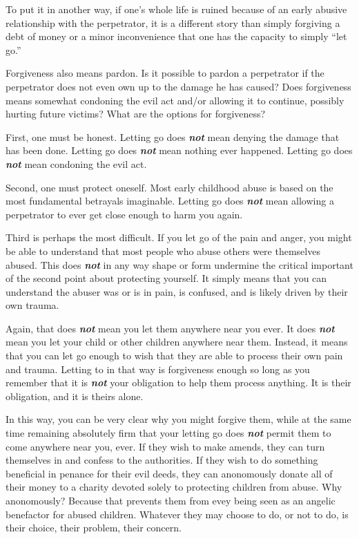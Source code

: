 \documentclass[]{book}
\begin{document}
To put it in another way, if one's whole life is ruined because of an early abusive relationship with the perpetrator, it is a different story than simply forgiving a debt of money or a minor inconvenience that one has the capacity to simply ``let go.''

Forgiveness also means pardon. Is it possible to pardon a perpetrator if the perpetrator does not even own up to the damage he has caused? Does forgiveness means somewhat condoning the evil act and/or allowing it to continue, possibly hurting future victims? What are the options for forgiveness?

First, one must be honest. Letting go does \textbf{\emph{not}} mean denying the damage that has been done. Letting go does \textbf{\emph{not}} mean nothing ever happened. Letting go does \textbf{\emph{not}} mean condoning the evil act.

Second, one must protect oneself. Most early childhood abuse is based on the most fundamental betrayals imaginable. Letting go does \textbf{\emph{not}} mean allowing a perpetrator to ever get close enough to harm you again.

Third is perhaps the most difficult. If you let go of the pain and anger, you might be able to understand that most people who abuse others were themselves abused. This does \textbf{\emph{not}} in any way shape or form undermine the critical important of the second point about protecting yourself. It simply means that you can understand the abuser was or is in pain, is confused, and is likely driven by their own trauma.

Again, that does \textbf{\emph{not}} mean you let them anywhere near you ever. It does \textbf{\emph{not}} mean you let your child or other children anywhere near them. Instead, it means that you can let go enough to wish that they are able to process their own pain and trauma. Letting to in that way is forgiveness enough so long as you remember that it is \textbf{\emph{not}} your obligation to help them process anything. It is their obligation, and it is theirs alone.

In this way, you can be very clear why you might forgive them, while at the same time remaining absolutely firm that your letting go does \textbf{\emph{not}} permit them to come anywhere near you, ever. If they wish to make amends, they can turn themselves in and confess to the authorities. If they wish to do something beneficial in penance for their evil deeds, they can anonomously donate all of their money to a charity devoted solely to protecting children from abuse. Why anonomously? Because that prevents them from evey being seen as an angelic benefactor for abused children. Whatever they may choose to do, or not to do, is their choice, their problem, their concern.
\end{document}
